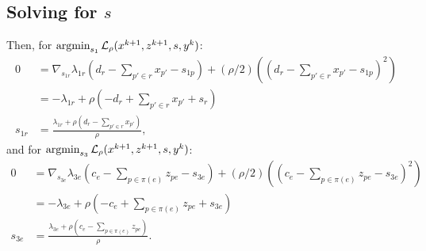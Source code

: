 \documentclass[11pt]{article}
\begin{document}
\subsection{Solving for $s$}
Then, for $\operatorname*{argmin}_{s_1} \mathcal{L}_\rho(x^{k+1},z^{k+1},s,y^k)$:
\begin{align*}
0
&= \nabla_{s_{1r}}\lambda_{1r}(d_r - \sum_{p'\in r}x_{p'} - s_{1p})
    + (\rho/2)((d_r - \sum_{p'\in r}x_{p'} - s_{1p})^2)\\
&= -\lambda_{1r} + \rho(-d_r + \sum_{p'\in r}x_{p'} + s_r)\\
s_{1r} &= \frac{\lambda_{1r} + \rho(d_r - \sum_{p'\in r}x_{p'})}{\rho},
\end{align*}
and for $\operatorname*{argmin}_{s_3} \mathcal{L}_\rho(x^{k+1},z^{k+1},s,y^k)$:
\begin{align*}
0
&= \nabla_{s_{3e}} \lambda_{3e}(c_e - \sum_{p\in\pi(e)} z_{pe} - s_{3e})
    + (\rho/2)((c_e - \sum_{p\in\pi(e)} z_{pe} - s_{3e})^2)\\
&= -\lambda_{3e} + \rho(-c_e + \sum_{p\in\pi(e)} z_{pe} + s_{3e})\\
s_{3e} &= \frac{\lambda_{3e} + \rho(c_e - \sum_{p\in\pi(e)}z_{pe})}{\rho}.
\end{align*}
\end{document}
